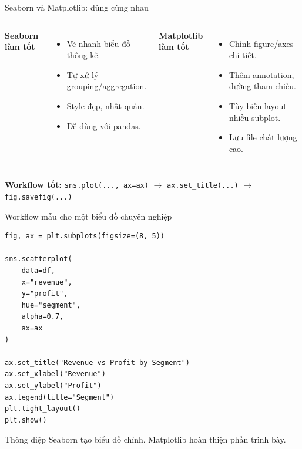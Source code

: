 \documentclass[aspectratio=169,11pt]{beamer}
\begin{document}
\begin{frame}{Seaborn và Matplotlib: dùng cùng nhau}
\begin{columns}[T,onlytextwidth]
\textbf{Seaborn làm tốt}
\begin{itemize}
    \item Vẽ nhanh biểu đồ thống kê.
    \item Tự xử lý grouping/aggregation.
    \item Style đẹp, nhất quán.
    \item Dễ dùng với pandas.
\end{itemize}

\textbf{Matplotlib làm tốt}
\begin{itemize}
    \item Chỉnh figure/axes chi tiết.
    \item Thêm annotation, đường tham chiếu.
    \item Tùy biến layout nhiều subplot.
    \item Lưu file chất lượng cao.
\end{itemize}
\end{columns}

\vspace{0.2cm}
\begin{center}
\textbf{Workflow tốt:} \texttt{sns.plot(..., ax=ax)} $\rightarrow$ \texttt{ax.set\_title(...)} $\rightarrow$ \texttt{fig.savefig(...)}
\end{center}
\end{frame}

\begin{frame}[fragile]{Workflow mẫu cho một biểu đồ chuyên nghiệp}
\begin{lstlisting}
fig, ax = plt.subplots(figsize=(8, 5))

sns.scatterplot(
    data=df,
    x="revenue",
    y="profit",
    hue="segment",
    alpha=0.7,
    ax=ax
)

ax.set_title("Revenue vs Profit by Segment")
ax.set_xlabel("Revenue")
ax.set_ylabel("Profit")
ax.legend(title="Segment")
plt.tight_layout()
plt.show()
\end{lstlisting}

\begin{block}{Thông điệp}
Seaborn tạo biểu đồ chính. Matplotlib hoàn thiện phần trình bày.
\end{block}
\end{frame}
\end{document}
